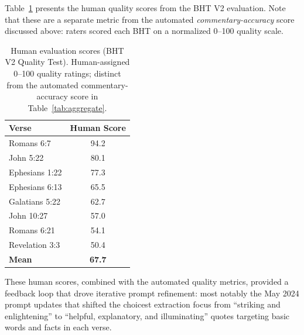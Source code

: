 \noindent Table~\ref{tab:human} presents the human quality scores from the BHT V2 evaluation. Note that these are a separate metric from the automated \emph{commentary-accuracy} score discussed above: raters scored each BHT on a normalized 0--100 quality scale.

\begin{table}[htbp]
\centering
\small
\caption{Human evaluation scores (BHT V2 Quality Test). Human-assigned 0--100 quality ratings; distinct from the automated commentary-accuracy score in Table~\ref{tab:aggregate}.}
\label{tab:human}
\begin{tabular}{@{}lc@{}}
\toprule
\textbf{Verse} & \textbf{Human Score} \\
\midrule
Romans 6:7 & 94.2 \\
John 5:22 & 80.1 \\
Ephesians 1:22 & 77.3 \\
Ephesians 6:13 & 65.5 \\
Galatians 5:22 & 62.7 \\
John 10:27 & 57.0 \\
Romans 6:21 & 54.1 \\
Revelation 3:3 & 50.4 \\
\midrule
\textbf{Mean} & \textbf{67.7} \\
\bottomrule
\end{tabular}
\end{table}

\noindent These human scores, combined with the automated quality metrics, provided a feedback loop that drove iterative prompt refinement: most notably the May 2024 prompt updates that shifted the choicest extraction focus from ``striking and enlightening'' to ``helpful, explanatory, and illuminating'' quotes targeting basic words and facts in each verse.
